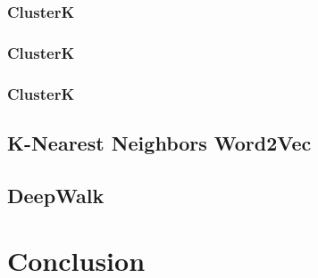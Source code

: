 \subsubsection*{ClusterK}

\subsubsection*{ClusterK}

\subsubsection*{ClusterK}

\subsection{K-Nearest Neighbors Word2Vec}

\subsection{DeepWalk}



\section{Conclusion}






